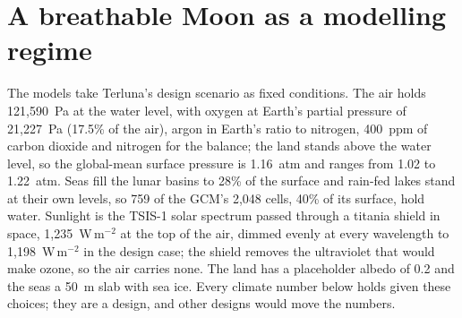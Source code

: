 \section{A breathable Moon as a modelling regime}

The models take Terluna's design scenario as fixed conditions. The air holds 121,590~Pa at the water level,
with oxygen at Earth's partial pressure of 21,227~Pa (17.5\% of the air), argon in Earth's ratio to nitrogen,
400~ppm of carbon dioxide and nitrogen for the balance; the land stands above the water level, so the
global-mean surface pressure is 1.16~atm and ranges from 1.02 to 1.22~atm. Seas fill the lunar
basins to 28\% of the surface and rain-fed lakes stand at their own levels, so 759 of the GCM's 2,048
cells, 40\% of its surface, hold water. Sunlight is the TSIS-1 solar spectrum
\autocite{coddington2021tsis} passed through a titania shield in space, 1,235~W\,m$^{-2}$ at the top of the
air, dimmed evenly at every wavelength to 1,198~W\,m$^{-2}$ in the design case; the shield removes the
ultraviolet that would make ozone, so the air carries none. The land has a placeholder albedo of
0.2 and the seas a 50~m slab with sea ice. Every climate number below holds given these choices; they are a
design, and other designs would move the numbers.

